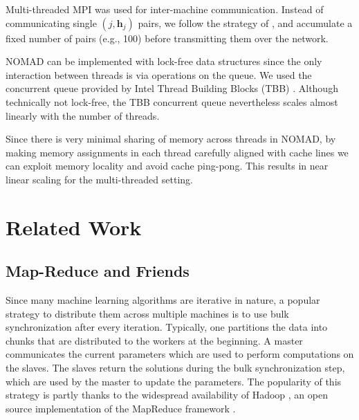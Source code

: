 \documentclass{vldb}
\newcommand{\hb}{\mathbf{h}}
\begin{document}
Multi-threaded MPI was used for inter-machine communication. Instead
of communicating single $(j, \hb_{j})$ pairs, we follow the strategy
of \citep{SmoNar10}, and accumulate a fixed number of pairs (e.g.,
100) before transmitting them over the network.


NOMAD can be implemented with lock-free data structures since the only
interaction between threads is via operations on the queue.  We used
the concurrent queue provided by Intel Thread Building Blocks (TBB)
\citep{TBB}. Although technically not lock-free, the TBB concurrent
queue nevertheless scales almost linearly with the number of threads.

Since there is very minimal sharing of memory across threads in NOMAD,
by making memory assignments in each thread carefully aligned with
cache lines we can exploit memory locality and avoid cache
ping-pong. This results in near linear scaling for the multi-threaded
setting.





\section{Related Work}
\label{sec:RelatedWork}

\subsection{Map-Reduce and Friends}
\label{sec:MapReduceFriends}

Since many machine learning algorithms are iterative in nature, a
popular strategy to distribute them across multiple machines is to use
bulk synchronization after every iteration. Typically, one partitions
the data into chunks that are distributed to the workers at the
beginning. A master communicates the current parameters which are used
to perform computations on the slaves. The slaves return the solutions
during the bulk synchronization step, which are used by the master to
update the parameters. The popularity of this strategy is partly thanks
to the widespread availability of Hadoop
\citep{Hadoop}, an open source implementation of the MapReduce framework
\cite{DeaGhe08}.
\end{document}
